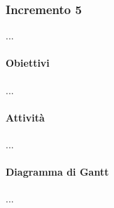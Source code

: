 \subsubsection{Incremento 5}
...
\paragraph{Obiettivi}
...
\paragraph{Attività}
...
\paragraph{Diagramma di Gantt}
...

